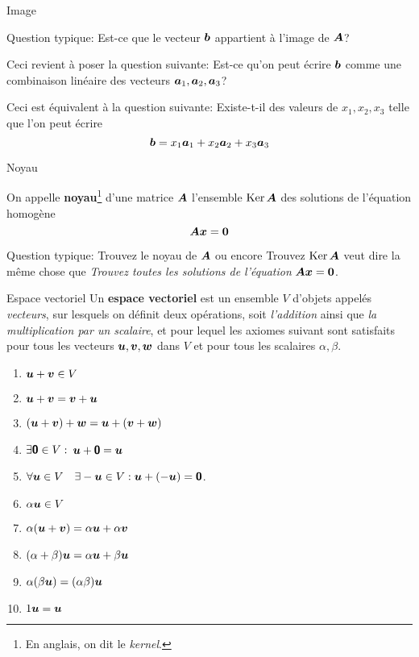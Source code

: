 \documentclass[french, handout]{beamer}
\begin{document}
\begin{frame}{Image}

Question typique: Est-ce que le vecteur $\boldsymbol{b}$ appartient à l'image
de $\boldsymbol{A}$?
\vfill

Ceci revient à poser la question suivante: Est-ce qu'on peut écrire
$\boldsymbol{b}$ comme une combinaison linéaire des vecteurs $\boldsymbol{a}_1, \boldsymbol{a}_2, \boldsymbol{a}_3$?

\vfill
Ceci est équivalent à la question suivante: Existe-t-il des valeurs de
$x_1, x_2, x_3$ telle que l'on peut écrire
\[
\boldsymbol{b} = x_1\boldsymbol{a}_1 + x_2 \boldsymbol{a}_2 + x_3 \boldsymbol{a}_3
\]
\end{frame}		

\begin{frame}{Noyau}

On appelle \textbf{noyau}\footnote{En anglais, on dit le \textit{kernel}.} d'une matrice $\boldsymbol{A}$ l'ensemble $\operatorname{Ker}\boldsymbol{A}$ des solutions
de l'équation homogène
\[
\boldsymbol{A}\boldsymbol{x} = \boldsymbol{0}
\]

\vfill
Question typique: {\color{blue} Trouvez le noyau de $\boldsymbol{A}$}
ou encore {\color{blue} Trouvez $\operatorname{Ker}\boldsymbol{A}$} veut dire la
même chose que \textit{Trouvez toutes les solutions de l'équation} 
$\boldsymbol{A}\boldsymbol{x} = \boldsymbol{0}$.
\end{frame}		
	
\begin{frame}{Espace vectoriel}
Un \textbf{espace vectoriel} est un ensemble $V$ d'objets appelés \textit{vecteurs}, sur lesquels on définit
deux opérations, soit \textit{l'addition} ainsi que \textit{la multiplication par un scalaire}, et pour lequel
les axiomes suivant sont satisfaits pour tous les vecteurs $\boldsymbol{u}, \boldsymbol{v}, \boldsymbol{w}$ dans $V$
et pour tous les scalaires $\alpha, \beta$.
\begin{enumerate}
\item {\color{red} $\boldsymbol{u}+\boldsymbol{v}\in V$}
\item  $\boldsymbol{u} + \boldsymbol{v} = \boldsymbol{v} + \boldsymbol{u}$
\item  $ (\boldsymbol{u} + \boldsymbol{v}) + \boldsymbol{w} = \boldsymbol{u} + (\boldsymbol{v} + \boldsymbol{w})$
\item {\color{red} $\exists\mbox{\textsf{\textbf{{0}}}}\in V:$} $ \boldsymbol{u} + \mbox{\textsf{\textbf{{0}}}} = \boldsymbol{u}$
\item $\forall \boldsymbol{u}\in V\quad \exists-\boldsymbol{u}\in V: \boldsymbol{u} + (-\boldsymbol{u}) = \mbox{\textsf{\textbf{{0}}}}$.
\item {\color{red} $\alpha\boldsymbol{u} \in V$}
\item $\alpha(\boldsymbol{u} + \boldsymbol{v}) = \alpha\boldsymbol{u} + \alpha\boldsymbol{v}$
\item  $ (\alpha + \beta)\boldsymbol{u} = \alpha\boldsymbol{u} + \beta\boldsymbol{u}$
\item  $\alpha(\beta\boldsymbol{u}) = (\alpha\beta)\boldsymbol{u}$
\item  $1\boldsymbol{u} = \boldsymbol{u}$
\end{enumerate}
\end{frame}
\end{document}
